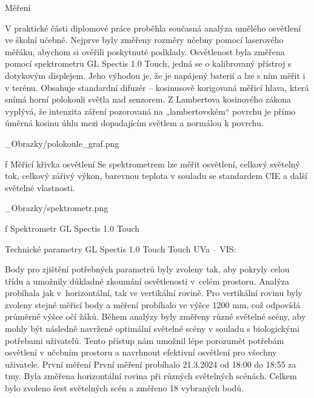 \chap Měření

V praktické části diplomové práce proběhla současná analýza umělého osvětlení ve školní učebně.
Nejprve byly změřeny rozměry učebny pomocí laserového měřáku, 
abychom si ověřili poskytnuté podklady.
Osvětlenost byla změřena pomocí spektrometru {\sbf GL Spectis 1.0 Touch}, jedná se o kalibrovaný přístroj s dotykovým displejem. Jeho výhodou je, že je napájený baterií a lze s ním měřit i v terénu. Obsahuje standardní difuzér – kosinusově korigovaná měřicí hlava, která snímá horní polokouli světla nad senzorem. Z Lambertova kosinového zákona vyplývá, že intenzita záření pozorovaná na „lambertovském“ povrchu je přímo úměrná kosinu úhlu mezi dopadajícím světlem a normálou k povrchu.

\medskip {}
\picw=8cm _Obrazky/polokoule_graf.png
\caption/f Měřicí křivka osvětlení
\medskip
Se spektrometrem lze měřit osvětlení, celkový světelný tok, celkový zářivý výkon, barevnou teplota v souladu se standardem CIE a další světelné vlastnosti.

\medskip {}
\picw=5cm _Obrazky/spektrometr.png
\caption/f Spektrometr GL Spectis 1.0 Touch
\medskip

\medskip
{\sbf Technické parametry GL Spectis 1.0 Touch Touch UVa – VIS:}
\medskip
{}

\medskip
Body pro zjištění potřebných parametrů byly zvoleny tak, aby pokryly celou třídu a umožnily důkladné zkoumání osvětlenosti v~celém prostoru. Analýza probíhala jak v~horizontální, tak ve vertikální rovině. Pro vertikální rovinu byly zvoleny stejné měřicí body a měření probíhalo ve výšce 1200 mm, což odpovídá průměrné výšce očí žáků.
\medskip
Během analýzy byly změřeny různé světelné scény, aby mohly být následně navržené optimální světelné scény v souladu s biologickými potřebami uživatelů. Tento přístup nám umožnil lépe porozumět potřebám osvětlení v učebním prostoru a navrhnout efektivní osvětlení pro všechny uživatele.
\medskip
\sec První měření
První měření probíhalo 21.3.2024 od 18:00 do 18:55 za tmy. Byla změřena horizontální rovina při různých světelných scénách. Celkem bylo zvoleno šest světelných scén a změřeno 18 vybraných bodů.
\medskip

